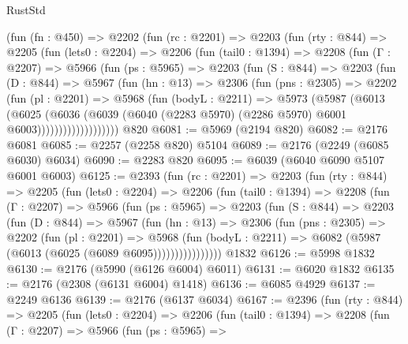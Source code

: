 \begin{lexlean}{RustStd}
\begin{coremodule}
    (fun (fn : @450) =>
    @2202
      (fun (rc : @2201) =>
      @2203
        (fun (rty : @844) =>
        @2205
          (fun (lets0 : @2204) =>
          @2206
            (fun (tail0 : @1394) =>
            @2208
              (fun (Γ : @2207) =>
              @5966
                (fun (ps : @5965) =>
                @2203
                  (fun (S : @844) =>
                  @2203
                    (fun (D : @844) =>
                    @5967
                      (fun (hn : @13) =>
                      @2306
                        (fun (pns : @2305) =>
                        @2202
                          (fun (pl : @2201) =>
                          @5968
                            (fun (bodyL : @2211) =>
                            @5973
                              (@5987
                                (@6013
                                  (@6025
                                    (@6036
                                      (@6039
                                        (@6040
                                          (@2283 @5970)
                                          (@2286 @5970)
                                          @6001
                                          @6003)))))))))))))))))))
    @820
@6081 := @5969 (@2194 @820)
@6082 := @2176 @6081
@6085 := @2257 (@2258 @820) @5104
@6089 := @2176 (@2249 (@6085 @6030) @6034)
@6090 := @2283 @820
@6095 := @6039 (@6040 @6090 @5107 @6001 @6003)
@6125 := @2393
    (fun (rc : @2201) =>
    @2203
      (fun (rty : @844) =>
      @2205
        (fun (lets0 : @2204) =>
        @2206
          (fun (tail0 : @1394) =>
          @2208
            (fun (Γ : @2207) =>
            @5966
              (fun (ps : @5965) =>
              @2203
                (fun (S : @844) =>
                @2203
                  (fun (D : @844) =>
                  @5967
                    (fun (hn : @13) =>
                    @2306
                      (fun (pns : @2305) =>
                      @2202
                        (fun (pl : @2201) =>
                        @5968
                          (fun (bodyL : @2211) =>
                          @6082 (@5987 (@6013 (@6025 (@6089 @6095))))))))))))))))
    @1832
@6126 := @5998 @1832
@6130 := @2176 (@5990 (@6126 @6004) @6011)
@6131 := @6020 @1832
@6135 := @2176 (@2308 (@6131 @6004) @1418)
@6136 := @6085 @4929
@6137 := @2249 @6136
@6139 := @2176 (@6137 @6034)
@6167 := @2396
    (fun (rty : @844) =>
    @2205
      (fun (lets0 : @2204) =>
      @2206
        (fun (tail0 : @1394) =>
        @2208
          (fun (Γ : @2207) =>
          @5966
            (fun (ps : @5965) =>

\end{coremodule}
\end{lexlean}

